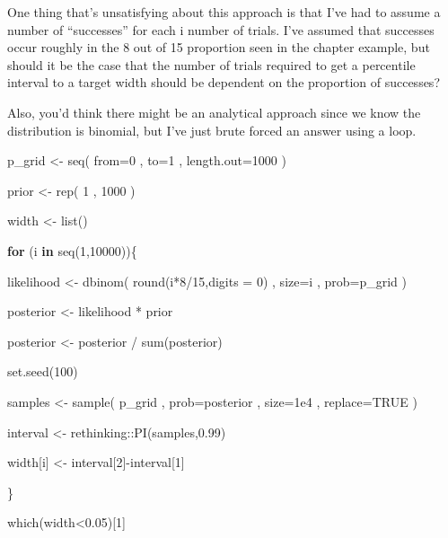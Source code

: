 \documentclass[
]{book}
\newenvironment{Shaded}{\begin{snugshade}}{\end{snugshade}}
\newcommand{\AttributeTok}[1]{\textcolor[rgb]{0.77,0.63,0.00}{#1}}
\newcommand{\ConstantTok}[1]{\textcolor[rgb]{0.00,0.00,0.00}{#1}}
\newcommand{\ControlFlowTok}[1]{\textcolor[rgb]{0.13,0.29,0.53}{\textbf{#1}}}
\newcommand{\DecValTok}[1]{\textcolor[rgb]{0.00,0.00,0.81}{#1}}
\newcommand{\FloatTok}[1]{\textcolor[rgb]{0.00,0.00,0.81}{#1}}
\newcommand{\FunctionTok}[1]{\textcolor[rgb]{0.00,0.00,0.00}{#1}}
\newcommand{\NormalTok}[1]{#1}
\newcommand{\OtherTok}[1]{\textcolor[rgb]{0.56,0.35,0.01}{#1}}
\newcommand{\SpecialCharTok}[1]{\textcolor[rgb]{0.00,0.00,0.00}{#1}}
\begin{document}
One thing that's unsatisfying about this approach is that I've had to assume a number of ``successes'' for each i number of trials. I've assumed that successes occur roughly in the 8 out of 15 proportion seen in the chapter example, but should it be the case that the number of trials required to get a percentile interval to a target width should be dependent on the proportion of successes?

Also, you'd think there might be an analytical approach since we know the distribution is binomial, but I've just brute forced an answer using a loop.

\begin{Shaded}
\begin{Highlighting}[]
\NormalTok{p\_grid }\OtherTok{\textless{}{-}} \FunctionTok{seq}\NormalTok{( }\AttributeTok{from=}\DecValTok{0}\NormalTok{ , }\AttributeTok{to=}\DecValTok{1}\NormalTok{ , }\AttributeTok{length.out=}\DecValTok{1000}\NormalTok{ ) }

\NormalTok{prior }\OtherTok{\textless{}{-}} \FunctionTok{rep}\NormalTok{( }\DecValTok{1}\NormalTok{ , }\DecValTok{1000}\NormalTok{ ) }

\NormalTok{width }\OtherTok{\textless{}{-}} \FunctionTok{list}\NormalTok{()}

\ControlFlowTok{for}\NormalTok{ (i }\ControlFlowTok{in} \FunctionTok{seq}\NormalTok{(}\DecValTok{1}\NormalTok{,}\DecValTok{10000}\NormalTok{))\{}
  
\NormalTok{  likelihood }\OtherTok{\textless{}{-}} \FunctionTok{dbinom}\NormalTok{( }\FunctionTok{round}\NormalTok{(i}\SpecialCharTok{*}\DecValTok{8}\SpecialCharTok{/}\DecValTok{15}\NormalTok{,}\AttributeTok{digits =} \DecValTok{0}\NormalTok{) , }\AttributeTok{size=}\NormalTok{i , }\AttributeTok{prob=}\NormalTok{p\_grid ) }
  
\NormalTok{  posterior }\OtherTok{\textless{}{-}}\NormalTok{ likelihood }\SpecialCharTok{*}\NormalTok{ prior}
  
\NormalTok{  posterior }\OtherTok{\textless{}{-}}\NormalTok{ posterior }\SpecialCharTok{/} \FunctionTok{sum}\NormalTok{(posterior)}
  
  \FunctionTok{set.seed}\NormalTok{(}\DecValTok{100}\NormalTok{) }
  
\NormalTok{  samples }\OtherTok{\textless{}{-}} \FunctionTok{sample}\NormalTok{( p\_grid , }\AttributeTok{prob=}\NormalTok{posterior , }\AttributeTok{size=}\FloatTok{1e4}\NormalTok{ , }\AttributeTok{replace=}\ConstantTok{TRUE}\NormalTok{ )}
  
\NormalTok{  interval }\OtherTok{\textless{}{-}}\NormalTok{ rethinking}\SpecialCharTok{::}\FunctionTok{PI}\NormalTok{(samples,}\FloatTok{0.99}\NormalTok{)}

\NormalTok{  width[i] }\OtherTok{\textless{}{-}}\NormalTok{ interval[}\DecValTok{2}\NormalTok{]}\SpecialCharTok{{-}}\NormalTok{interval[}\DecValTok{1}\NormalTok{]}
  
\NormalTok{\}}

 \FunctionTok{which}\NormalTok{(width}\SpecialCharTok{\textless{}}\FloatTok{0.05}\NormalTok{)[}\DecValTok{1}\NormalTok{]}
\end{Highlighting}
\end{Shaded}
\end{document}

